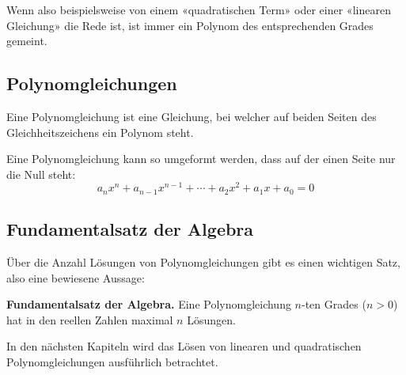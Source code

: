 Wenn also beispielsweise von einem «quadratischen Term» oder einer «linearen Gleichung» die Rede ist, ist immer ein Polynom des entsprechenden Grades gemeint.

\subsection{Polynomgleichungen}


Eine Polynomgleichung ist eine Gleichung, bei welcher auf beiden Seiten des Gleichheitszeichens ein Polynom steht.

Eine Polynomgleichung kann so umgeformt werden, dass auf der einen Seite nur die Null steht:
\[
  a_{n}x^{n} + a_{n-1}x^{n-1} + \cdots + a_{2}x^{2} + a_{1}x + a_{0} = 0
\]

\subsection{Fundamentalsatz der Algebra}

Über die Anzahl Lösungen von Polynomgleichungen gibt es einen wichtigen Satz, also eine bewiesene Aussage:

\begin{theorem}
  \textbf{Fundamentalsatz der Algebra.} Eine Polynomgleichung $n$-ten Grades ($n > 0$) hat in den reellen Zahlen maximal $n$ Lösungen.
\end{theorem}

In den nächsten Kapiteln wird das Lösen von linearen und quadratischen Polynomgleichungen ausführlich betrachtet.
